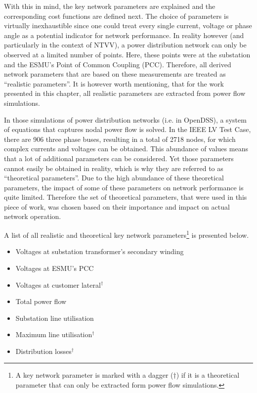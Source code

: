 With this in mind, the key network parameters are explained and the corresponding cost functions are defined next.
The choice of parameters is virtually inexhaustible since one could treat every single current, voltage or phase angle as a potential indicator for network performance.
In reality however (and particularly in the context of NTVV), a power distribution network can only be observed at a limited number of points.
Here, these points were at the substation and the ESMU's Point of Common Coupling (PCC).
Therefore, all derived network parameters that are based on these measurements are treated as ``realistic parameters''.
It is however worth mentioning, that for the work presented in this chapter, all realistic parameters are extracted from power flow simulations.

In those simulations of power distribution networks (i.e. in OpenDSS), a system of equations that captures nodal power flow is solved.
In the IEEE LV Test Case, there are 906 three phase buses, resulting in a total of 2718 nodes, for which complex currents and voltages can be obtained.
This abundance of values means that a lot of additional parameters can be considered.
Yet those parameters cannot easily be obtained in reality, which is why they are referred to as ``theoretical parameters''.
Due to the high abundance of these theoretical parameters, the impact of some of these parameters on network performance is quite limited.
Therefore the set of theoretical parameters, that were used in this piece of work, was chosen based on their importance and impact on actual network operation.

A list of all realistic and theoretical key network parameters\footnote[1]{A key network parameter is marked with a dagger ($\dagger$) if it is a theoretical parameter that can only be extracted form power flow simulations.} is presented below.

\begin{itemize}
	\item Voltages at substation transformer's secondary winding
	\item Voltages at ESMU's PCC
	\item Voltages at customer lateral$^{\dagger}$
	\item Total power flow
	\item Substation line utilisation
	\item Maximum line utilisation$^{\dagger}$
	\item Distribution losses$^{\dagger}$
\end{itemize}

